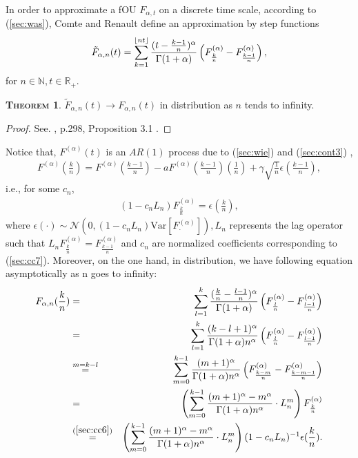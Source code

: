 \documentclass[a4paper, twoside, 11pt]{article}
\theoremstyle{definition}
\newtheorem{theorem}[definition]{\scshape Theorem}
\DeclarePairedDelimiter\floor{\lfloor}{\rfloor}
\newcommand{\brkt}[1]{\left({#1} \right)}
\begin{document}
  In order to approximate a fOU $ F_{\alpha,t}$ on a discrete time scale, according to (\ref{sec:was}), Comte and Renault \cite{comren} define an approximation by step functions
  \begin{eqnarray}
   \tilde{F}_{\alpha,n}(t) = \sum_{k=1}^{\floor{nt}} \frac{(t - \frac{k-1}{n})^\alpha}{\Gamma(1+\alpha)} \brkt{F^{(\alpha)}_{\frac{k}{n}} - F^{(\alpha)}_{\frac{k-1}{n}}},
	\label{sec:cc7}
  \end{eqnarray}
  for $n\in \mathbb{N}, t\in\mathbb{R}_+$.
  \begin{theorem}
	$\tilde{F}_{\alpha,n}(t)\rightarrow F_{\alpha,n}(t)$ in distribution as $n$ tends to infinity.  
	\label{sec:cont}
  \end{theorem}
  \begin{proof}
	See. \cite{comren}, p.298, Proposition 3.1 .
  \end{proof}
  Notice that, $F^{(\alpha)}(t)$ is an $AR(1)$ process due to (\ref{sec:wie}) and (\ref{sec:cont3}) , 
  \begin{eqnarray*}
	F^{(\alpha)}(\frac{k}{n}) = F^{(\alpha)}(\frac{k-1}{n}) - a F^{(\alpha)}(\frac{k-1}{n})(\frac{1}{n}) + \gamma \sqrt{\frac{1}{n}}\epsilon(\frac{k-1}{n}), 
  \end{eqnarray*}
  i.e., for some $c_n$,
  \begin{eqnarray}
	(1-c_nL_n) {F}^{(\alpha)}_{\frac{k}{n}} = \epsilon(\frac{k}{n}),
	\label{sec:cc6}
  \end{eqnarray}
  where $\epsilon(\cdot) \sim \mathcal{N}(0, (1-c_nL_n)\mathrm{Var}[F^{(\alpha)}_{\cdot}]), L_n $ represents the lag operator such that $L_n F^{(\alpha)}_{\frac{k}{n}} = F^{(\alpha)}_{\frac{k-1}{n}}$  and $c_n$ are normalized coefficients corresponding to (\ref{sec:cc7}). Moreover, on the one hand, in distribution, we have following equation asymptotically as n goes to infinity:
  \begin{eqnarray}
	F_{\alpha,n}(\frac{k}{n}) &=& \sum_{l=1}^{k} \frac{(\frac{k}{n} - \frac{l-1}{n})^\alpha}{\Gamma(1+\alpha)} \brkt{F^{(\alpha)}_{\frac{l}{n}} - F^{(\alpha)}_{\frac{l-1}{n}}}\nonumber\\
	&=& \sum_{l=1}^{k} \frac{(k - l + 1)^\alpha}{\Gamma(1+\alpha)n^\alpha} \brkt{F^{(\alpha)}_{\frac{l}{n}} - F^{(\alpha)}_{\frac{l-1}{n}}}\nonumber\\
	&\overset{m=k-l}{=}& \sum_{m=0}^{k-1} \frac{(m + 1)^\alpha}{\Gamma(1+\alpha)n^\alpha} \brkt{F^{(\alpha)}_{\frac{k-m}{n}} - F^{(\alpha)}_{\frac{k-m-1}{n}}}\nonumber\\ 
	&=& \brkt{\sum_{m=0}^{k-1} \frac{(m + 1)^\alpha - m^\alpha}{\Gamma(1+\alpha)n^\alpha} \cdot L_n^m} F^{(\alpha)}_{\frac{k}{n}} \nonumber\\
	&\overset{(\ref{sec:cc6})}{=}&  \brkt{\sum_{m=0}^{k-1} \frac{(m + 1)^\alpha - m^\alpha}{\Gamma(1+\alpha)n^\alpha} \cdot L_n^m} (1-c_nL_n)^{-1}\epsilon(\frac{k}{n}).
  \end{eqnarray}
\end{document}
